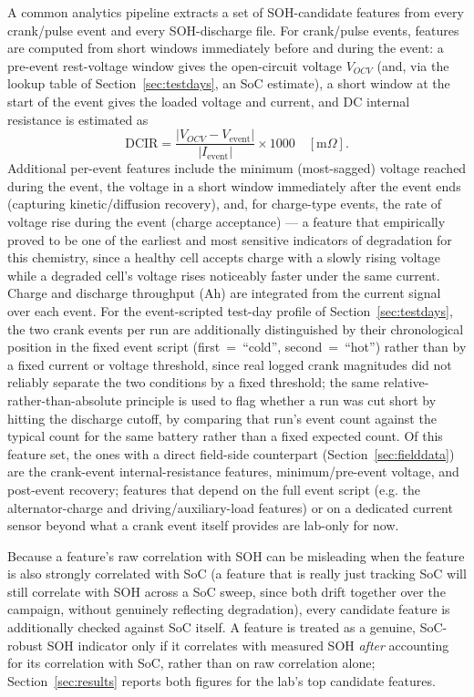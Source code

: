 \documentclass[conference]{IEEEtran}
\begin{document}
A common analytics pipeline extracts a set of SOH-candidate features from every crank/pulse event and every SOH-discharge file. For crank/pulse events, features are computed from short windows immediately before and during the event: a pre-event rest-voltage window gives the open-circuit voltage $V_{OCV}$ (and, via the lookup table of Section~\ref{sec:testdays}, an SoC estimate), a short window at the start of the event gives the loaded voltage and current, and DC internal resistance is estimated as
\[
\mathrm{DCIR} = \frac{|V_{OCV} - V_{\text{event}}|}{|I_{\text{event}}|} \times 1000 \quad [\mathrm{m}\Omega].
\]
Additional per-event features include the minimum (most-sagged) voltage reached during the event, the voltage in a short window immediately after the event ends (capturing kinetic/diffusion recovery), and, for charge-type events, the rate of voltage rise during the event (charge acceptance) --- a feature that empirically proved to be one of the earliest and most sensitive indicators of degradation for this chemistry, since a healthy cell accepts charge with a slowly rising voltage while a degraded cell's voltage rises noticeably faster under the same current. Charge and discharge throughput (Ah) are integrated from the current signal over each event. For the event-scripted test-day profile of Section~\ref{sec:testdays}, the two crank events per run are additionally distinguished by their chronological position in the fixed event script (first~=~``cold'', second~=~``hot'') rather than by a fixed current or voltage threshold, since real logged crank magnitudes did not reliably separate the two conditions by a fixed threshold; the same relative-rather-than-absolute principle is used to flag whether a run was cut short by hitting the discharge cutoff, by comparing that run's event count against the typical count for the same battery rather than a fixed expected count. Of this feature set, the ones with a direct field-side counterpart (Section~\ref{sec:fielddata}) are the crank-event internal-resistance features, minimum/pre-event voltage, and post-event recovery; features that depend on the full event script (e.g. the alternator-charge and driving/auxiliary-load features) or on a dedicated current sensor beyond what a crank event itself provides are lab-only for now.

Because a feature's raw correlation with SOH can be misleading when the feature is also strongly correlated with SoC (a feature that is really just tracking SoC will still correlate with SOH across a SoC sweep, since both drift together over the campaign, without genuinely reflecting degradation), every candidate feature is additionally checked against SoC itself. A feature is treated as a genuine, SoC-robust SOH indicator only if it correlates with measured SOH \emph{after} accounting for its correlation with SoC, rather than on raw correlation alone; Section~\ref{sec:results} reports both figures for the lab's top candidate features.
\end{document}
